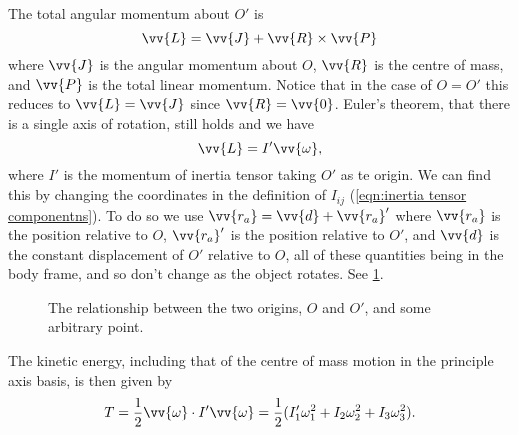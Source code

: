 \documentclass[fleqn]{NotesClass}
\begin{document}
    The total angular momentum about \(O'\) is
    \begin{equation}
        \vv{L} = \vv{J} + \vv{R} \times \vv{P}
    \end{equation}
    where \(\vv{J}\) is the angular momentum about \(O\), \(\vv{R}\) is the centre of mass, and \(\vv{P}\) is the total linear momentum.
    Notice that in the case of \(O = O'\) this reduces to \(\vv{L} = \vv{J}\) since \(\vv{R} = \vv{0}\).
    Euler's theorem, that there is a single axis of rotation, still holds and we have
    \begin{equation}
        \vv{L} = I'\vv{\omega},
    \end{equation}
    where \(I'\) is the momentum of inertia tensor taking \(O'\) as te origin.
    We can find this by changing the coordinates in the definition of \(I_{ij}\) (\cref{eqn:inertia tensor componentns}).
    To do so we use \(\vv{r_a} = \vv{d} + \vv{r_a}'\) where \(\vv{r_a}\) is the position relative to \(O\), \(\vv{r_a}'\) is the position relative to \(O'\), and \(\vv{d}\) is the constant displacement of \(O'\) relative to \(O\), all of these quantities being in the body frame, and so don't change as the object rotates.
    See \cref{fig:inertia tensor shifted origin}.
    
    \begin{figure}
        \caption{The relationship between the two origins, \(O\) and \(O'\), and some arbitrary point.}
        \label{fig:inertia tensor shifted origin}
    \end{figure}
    
    The kinetic energy, including that of the centre of mass motion in the principle axis basis, is then given by
    \begin{equation}
        T = \frac{1}{2}\vv{\omega} \cdot I' \vv{\omega} = \frac{1}{2}(I_1'\omega_1^2 + I_2\omega_2^2 + I_3\omega_3^2).
    \end{equation}
    
\end{document}

